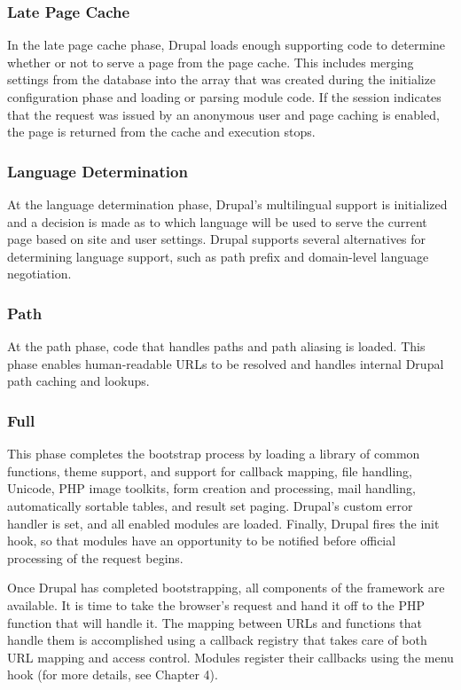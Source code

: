 \subsubsection{Late Page Cache}

In the late page cache phase, Drupal loads enough supporting code to determine whether or not to serve a page from the page cache. This includes merging settings from the database into the array that was created during the initialize configuration phase and loading or parsing module code. If the session indicates that the request was issued by an anonymous user and page caching is enabled, the page is returned from the cache and execution stops.

\subsubsection{Language Determination}

At the language determination phase, Drupal’s multilingual support is initialized and a decision is made as to which language will be used to serve the current page based on site and user settings. Drupal supports several alternatives for determining language support, such as path prefix and domain-level language negotiation.

\subsubsection{Path}

At the path phase, code that handles paths and path aliasing is loaded. This phase enables human-readable URLs to be resolved and handles internal Drupal path caching and lookups.

\subsubsection{Full}

This phase completes the bootstrap process by loading a library of common functions, theme support, and support for callback mapping, file handling, Unicode, PHP image toolkits, form creation and processing, mail handling, automatically sortable tables, and result set paging. Drupal’s custom error handler is set, and all enabled modules are loaded. Finally, Drupal fires the init hook, so that modules have an opportunity to be notified before official processing of the request begins.

Once Drupal has completed bootstrapping, all components of the framework are available. It is time to take the browser’s request and hand it off to the PHP function that will handle it. The mapping between URLs and functions that handle them is accomplished using a callback registry that takes care of both URL mapping and access control. Modules register their callbacks using the menu hook (for more details, see Chapter 4).

